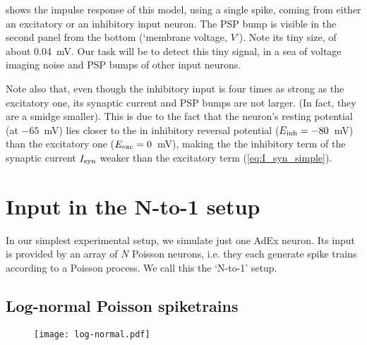  shows the impulse response of this model, using a single spike, coming from either an excitatory or an inhibitory input neuron. The PSP bump is visible in the second panel from the bottom (`membrane voltage, $V$'). Note its tiny size, of about 0.04~mV. Our task will be to detect this tiny signal, in a sea of voltage imaging noise and PSP bumps of other input neurons.

Note also that, even though the inhibitory input is four times as strong as the excitatory one, its synaptic current and PSP bumps are not larger. (In fact, they are a smidge smaller). This is due to the fact that the neuron's resting potential (at $-65$~mV) lies closer to the in inhibitory reversal potential ($E_{\text{inh}} = -80$~mV) than the excitatory one ($E_{\text{exc}} = 0$~mV), making the the inhibitory term of the synaptic current $I_{\text{syn}}$ weaker than the excitatory term  (\cref{eq:I_syn_simple}).



\FloatBarrier
\section{Input in the N-to-1 setup}

In our simplest experimental setup, we simulate just one AdEx neuron.
Its input is provided by an array of $N$ Poisson neurons, i.e. they each generate spike trains according to a Poisson process. We call this the `N-to-1' setup.

\subsection{Log-normal Poisson spiketrains}


\begin{figure}
    \hspace*{-4em}
    \texttt{[image: log-normal.pdf]}
    \label{fig:log-normal}
\end{figure}

